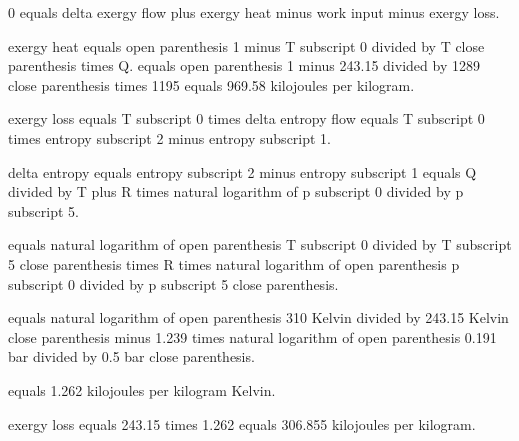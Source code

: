 0 equals delta exergy flow plus exergy heat minus work input minus exergy loss.  

exergy heat equals open parenthesis 1 minus T subscript 0 divided by T close parenthesis times Q.  
equals open parenthesis 1 minus 243.15 divided by 1289 close parenthesis times 1195 equals 969.58 kilojoules per kilogram.  

exergy loss equals T subscript 0 times delta entropy flow equals T subscript 0 times entropy subscript 2 minus entropy subscript 1.  

delta entropy equals entropy subscript 2 minus entropy subscript 1 equals Q divided by T plus R times natural logarithm of p subscript 0 divided by p subscript 5.  

equals natural logarithm of open parenthesis T subscript 0 divided by T subscript 5 close parenthesis times R times natural logarithm of open parenthesis p subscript 0 divided by p subscript 5 close parenthesis.  

equals natural logarithm of open parenthesis 310 Kelvin divided by 243.15 Kelvin close parenthesis minus 1.239 times natural logarithm of open parenthesis 0.191 bar divided by 0.5 bar close parenthesis.  

equals 1.262 kilojoules per kilogram Kelvin.  

exergy loss equals 243.15 times 1.262 equals 306.855 kilojoules per kilogram.